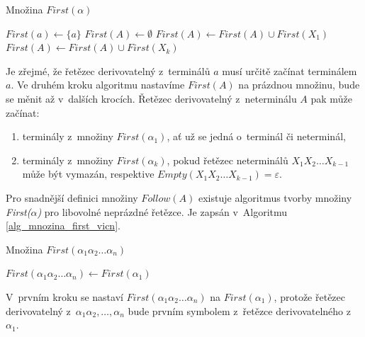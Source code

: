 \begin{algorithm}[ht]
    \caption{Množina $First(\alpha)$}
    \label{alg_mnozina_first}
    \begin{algorithmic}[1]
        \NewLine
            \State $First(a) \gets \{a\}$
        \EndFor
            \State $First(A) \gets \emptyset$
        \EndFor
                \State $First(A) \gets First(A) \cup First(X_1)$
                    \State $First(A) \gets First(A) \cup First(X_k)$ 
                \EndIf
            \EndIf
        \EndWhile
    \end{algorithmic}
\end{algorithm}
Je zřejmé, že řetězec derivovatelný z~terminálů $a$ musí určitě začínat terminálem $a$.
Ve druhém kroku algoritmu nastavíme $First(A)$ na prázdnou množinu, bude se měnit až v~dalších krocích.
Řetězec derivovatelný z~neterminálu $A$ pak může začínat:
\begin{enumerate}
    \item terminály z~množiny $First(\alpha_1)$, ať už se jedná o~terminál či neterminál,
    \item terminály z~množiny $First(\alpha_k)$, pokud řetězec neterminálů $X_1X_2\ldots X_{k-1}$ může být vymazán, respektive $Empty(X_1X_2\ldots X_{k-1}) = \varepsilon$.  
\end{enumerate}

Pro snadnější definici množiny $Follow(A)$ existuje algoritmus tvorby množiny \emph{First($\alpha$)} pro libovolné neprázdné řetězce.
Je zapsán v~Algoritmu \ref{alg_mnozina_first_vicn}.
\begin{algorithm}
    \caption{Množina $First(\alpha_1\alpha_2\ldots\alpha_n)$}
    \label{alg_mnozina_first_vicn}
    \begin{algorithmic}[1]
        \NewLine
        \State $First(\alpha_1\alpha_2\ldots \alpha_n) \gets First(\alpha_1)$
    \end{algorithmic}
\end{algorithm}
\addtocounter{algorithm}{-1}
V~prvním kroku se nastaví $First(\alpha_1\alpha_2\ldots \alpha_n)$ na $First(\alpha_1)$, protože řetězec derivovatelný z~$\alpha_1\alpha_2,\ldots,\alpha_n$ bude prvním symbolem z~řetězce derivovatelného z~$\alpha_1$.

